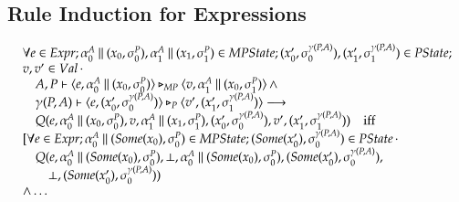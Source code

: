 \documentclass[a4paper,10pt]{article}
\begin{document}
\subsection*{Rule Induction for Expressions}
\begin{displaymath}
\begin{array}{l}
\forall e \in Expr; \alpha_0^A \mathbin{\|} (x_0, \sigma_0^P), \alpha_1^A \mathbin{\|} (x_1, \sigma_1^P) \in MPState; (x'_0, \sigma_0^{\gamma(P,A)}),
(x'_1, \sigma_1^{\gamma(P,A)}) \in PState;\\
v,v' \in Val\, \cdot\\
\quad A, P \vdash \langle e, \alpha_0^A \mathbin{\|} (x_0, \sigma_0^P) \rangle \triangleright_{MP} \langle v, \alpha_1^A \mathbin{\|} (x_0, \sigma_1^P) \rangle \,\wedge\\
\quad \gamma(P,A) \vdash \langle e, (x'_0, \sigma_0^{\gamma(P,A)}) \rangle \triangleright_P \langle v', (x'_1, \sigma_1^{\gamma(P,A)}) \rangle \longrightarrow\\
\quad Q(e, \alpha_0^A \mathbin{\|} (x_0, \sigma_0^P), v, \alpha_1^A \mathbin{\|} (x_1, \sigma_1^P), (x'_0, \sigma_0^{\gamma(P,A)}), v', (x'_1, \sigma_1^{\gamma(P,A)}))
\quad \text{iff}\\
\lbrack \forall e \in Expr; \alpha_0^A \mathbin{\|} (Some(x_0), \sigma_0^P) \in MPState; (Some(x'_0), \sigma_0^{\gamma(P,A)}) \in PState\,
\cdot\\
\quad Q(e, \alpha_0^A \mathbin{\|} (Some(x_0), \sigma_0^P), \bot, \alpha_0^A \mathbin{\|} (Some(x_0), \sigma_0^P), (Some(x'_0), \sigma_0^{\gamma(P,A)}),\\
\quad\quad \bot, (Some(x'_0), \sigma_0^{\gamma(P,A)}))\\
\wedge \ldots\\
\end{array}
\end{displaymath}
\end{document}
